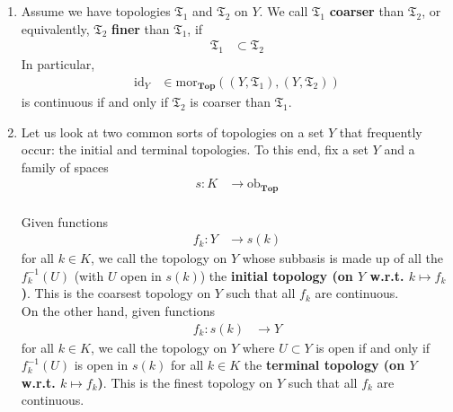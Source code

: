\begin{exa}
\begin{enumerate}
\begin{align*}
  f^{-1}
  \left(
    \bigcap_{k \in \mathbb{N}_{n}}
    U_{k}
  \right)
  &=
  \bigcap_{k \in \mathbb{N}_{n}}
  f^{-1}(U_{k})
  \\
  f^{-1}
  \left(
    \bigcup_{k \in K}
    U_{k}
  \right)
  &=
  \bigcup_{k \in K}
  f^{-1}(U_{k})
\end{align*}
Hence, it suffices to check the continuity of $f$ on a subbasis of $Y_{2}$.
\item[$\bullet$]
Assume we have topologies $\mathfrak{T}_{1}$ and $\mathfrak{T}_{2}$ on $Y$.
We call $\mathfrak{T}_{1}$ \textbf{coarser} than $\mathfrak{T}_{2}$, or equivalently, $\mathfrak{T}_{2}$ \textbf{finer} than $\mathfrak{T}_{1}$, if 
\begin{align*}
  \mathfrak{T}_{1}
  &\subset
  \mathfrak{T}_{2}
\end{align*}
In particular,
\begin{align*}
  \mathrm{id}_{Y}
  &\in
  \mathrm{mor}_{\mathbf{Top}}
  \left(
    (Y,\mathfrak{T}_{1}),
    (Y,\mathfrak{T}_{2})
  \right)
\end{align*}
is continuous if and only if $\mathfrak{T}_{2}$ is coarser than $\mathfrak{T}_{1}$.
\item[$\bullet$]
Let us look at two common sorts of topologies on a set $Y$ that frequently occur: the initial and terminal topologies.
To this end, fix a set $Y$ and a family of spaces
\begin{align*}
  s
  \colon
  K
  &\rightarrow
  \mathrm{ob}_{\mathbf{Top}}
\end{align*}
\\
Given functions
\begin{align*}
  f_{k}
  \colon
  Y
  &\rightarrow
  s(k)
\end{align*}
for all $k \in K$, we call the topology on $Y$ whose subbasis is made up of all the $f_{k}^{-1}(U)$ (with $U$ open in $s(k)$) the \textbf{initial topology (on $Y$ w.r.t. $k \mapsto f_{k}$)}.
This is the coarsest topology on $Y$ such that all $f_{k}$ are continuous.
\\
On the other hand, given functions
\begin{align*}
  f_{k}
  \colon
  s(k)
  &\rightarrow
  Y
\end{align*}
for all $k \in K$, we call the topology on $Y$ where $U \subset Y$ is open if and only if $f_{k}^{-1}(U)$ is open in $s(k)$ for all $k \in K$ the \textbf{terminal topology (on $Y$ w.r.t. $k \mapsto f_{k}$)}.
This is the finest topology on $Y$ such that all $f_{k}$ are continuous.

\end{enumerate}
\end{exa}
